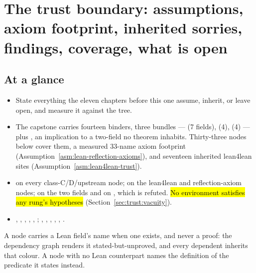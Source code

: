 \chapter{The trust boundary: assumptions, axiom footprint, inherited sorries, findings, coverage, what is open}
\label{chap:trust}

\section*{At a glance}
\begin{itemize}
\item {} State everything the eleven chapters before this one assume, inherit, or leave
open, and measure it against the tree.
\item {} The capstone carries fourteen binders, three bundles ---
 (7 fields),  (4),  (4) --- plus
, an implication to a two-field  no theorem inhabits.
Thirty-three nodes below cover them, a measured 33-name axiom footprint
(Assumption~\ref{asm:lean-reflection-axioms}), and seventeen inherited lean4lean 
sites (Assumption~\ref{asm:lean4lean-trust}).
\item {} \stAssumed{} on every class-C/D/upstream node; \stInherited{} on the
lean4lean and reflection-axiom nodes; \stOpen{} on the two  fields and on
, which is refuted. \hl{No environment satisfies any rung's
hypotheses} (Section~\ref{sec:trust:vacuity}).
\item {} , , ,
, , ; ,
, , ,
, .
\end{itemize}

\noindent{} A node carries a Lean field's name when one exists,
and never a proof: the dependency graph renders it stated-but-unproved, and every dependent
inherits that colour. A node with no Lean counterpart names the definition of the predicate it
states instead.

